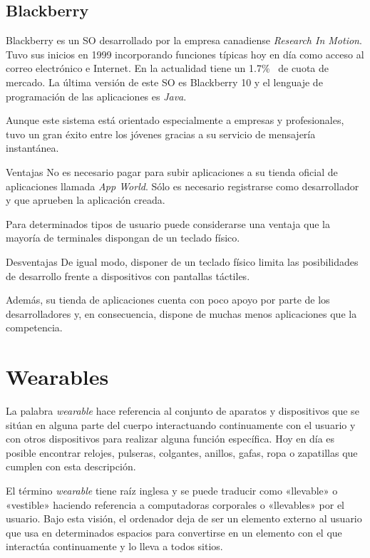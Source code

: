 \subsection{Blackberry}

Blackberry es un \acs{SO} desarrollado por la empresa canadiense \emph{Research In Motion}. Tuvo sus
inicios en 1999 incorporando funciones típicas hoy en día como acceso al correo electrónico e
Internet. En la actualidad tiene un 1.7\%~\cite{Llamas13} de cuota de mercado. La última versión de
este \acs{SO} es Blackberry 10 y el lenguaje de programación de las aplicaciones es \emph{Java}.

Aunque este sistema está orientado especialmente a empresas y profesionales, tuvo un gran éxito
entre los jóvenes gracias a su servicio de mensajería instantánea.

\begin{definitionlist}
  \item[Ventajas] No es necesario pagar para subir aplicaciones a su tienda oficial de aplicaciones
    llamada \emph{App World}. Sólo es necesario registrarse como desarrollador y que aprueben
    la aplicación creada.

    Para determinados tipos de usuario puede considerarse una ventaja que la mayoría de terminales
    dispongan de un teclado físico.

  \item[Desventajas] De igual modo, disponer de un teclado físico limita las posibilidades de
    desarrollo frente a dispositivos con pantallas táctiles.

    Además, su tienda de aplicaciones cuenta con poco apoyo por parte de los desarrolladores y, en
    consecuencia, dispone de muchas menos aplicaciones que la competencia.

\end{definitionlist}

\section{Wearables}

La palabra \emph{wearable} hace referencia al conjunto de aparatos y dispositivos que se sitúan en
alguna parte del cuerpo interactuando continuamente con el usuario y con otros dispositivos para
realizar alguna función específica. Hoy en día es posible  encontrar relojes, pulseras, colgantes,
anillos, gafas, ropa o zapatillas que cumplen con esta descripción.

El término \emph{wearable} tiene raíz inglesa y se puede traducir como «llevable» o «vestible»
haciendo referencia a computadoras corporales o «llevables» por el usuario. Bajo esta visión, el
ordenador deja de ser un elemento externo al usuario que usa en determinados espacios para
convertirse en un elemento con el que interactúa continuamente y lo lleva a todos sitios.

